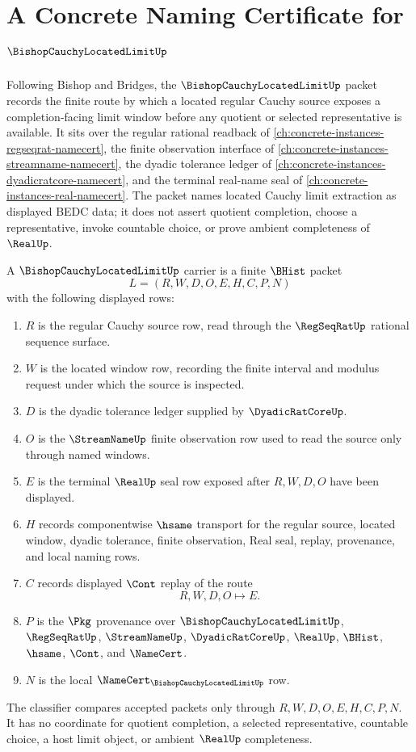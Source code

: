 \chapter{A Concrete Naming Certificate for $\BishopCauchyLocatedLimitUp$}
\label{ch:concrete-instances-bishop-cauchy-located-limit-namecert}

Following Bishop and Bridges, the $\BishopCauchyLocatedLimitUp$ packet records the finite route by which a located regular Cauchy source exposes a completion-facing limit window before any quotient or selected representative is available. It sits over the regular rational readback of \autoref{ch:concrete-instances-regseqrat-namecert}, the finite observation interface of \autoref{ch:concrete-instances-streamname-namecert}, the dyadic tolerance ledger of \autoref{ch:concrete-instances-dyadicratcore-namecert}, and the terminal real-name seal of \autoref{ch:concrete-instances-real-namecert}. The packet names located Cauchy limit extraction as displayed BEDC data; it does not assert quotient completion, choose a representative, invoke countable choice, or prove ambient completeness of $\RealUp$.

\begin{definition}
\label{def:bishop-cauchy-located-limit-carrier}
A $\BishopCauchyLocatedLimitUp$ carrier is a finite $\BHist$ packet
$$
L=(R,W,D,O,E,H,C,P,N)
$$
with the following displayed rows:
\begin{enumerate}
\item $R$ is the regular Cauchy source row, read through the $\RegSeqRatUp$ rational sequence surface.
\item $W$ is the located window row, recording the finite interval and modulus request under which the source is inspected.
\item $D$ is the dyadic tolerance ledger supplied by $\DyadicRatCoreUp$.
\item $O$ is the $\StreamNameUp$ finite observation row used to read the source only through named windows.
\item $E$ is the terminal $\RealUp$ seal row exposed after $R,W,D,O$ have been displayed.
\item $H$ records componentwise $\hsame$ transport for the regular source, located window, dyadic tolerance, finite observation, Real seal, replay, provenance, and local naming rows.
\item $C$ records displayed $\Cont$ replay of the route
$$
R,W,D,O \longmapsto E .
$$
\item $P$ is the $\Pkg$ provenance over $\BishopCauchyLocatedLimitUp$, $\RegSeqRatUp$, $\StreamNameUp$, $\DyadicRatCoreUp$, $\RealUp$, $\BHist$, $\hsame$, $\Cont$, and $\NameCert$.
\item $N$ is the local $\NameCert_{\BishopCauchyLocatedLimitUp}$ row.
\end{enumerate}
The classifier compares accepted packets only through $R,W,D,O,E,H,C,P,N$. It has no coordinate for quotient completion, a selected representative, countable choice, a host limit object, or ambient $\RealUp$ completeness.
\end{definition}

